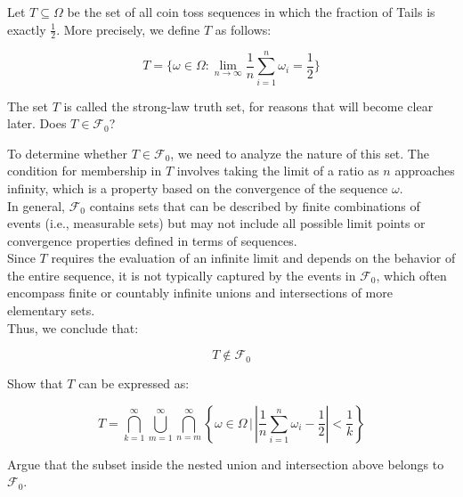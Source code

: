 \begin{exercise}
    Let \( T \subseteq \Omega \) be the set of all coin toss sequences in which the fraction of Tails is exactly \( \frac{1}{2} \). More precisely, we define \( T \) as follows:

\[
T = \{ \omega \in \Omega : \lim_{n \to \infty} \frac{1}{n} \sum_{i=1}^{n} \omega_i = \frac{1}{2} \}
\]

The set \( T \) is called the strong-law truth set, for reasons that will become clear later. Does \( T \in \mathcal{F}_0 \)?
\end{exercise}

\begin{solution}
    To determine whether \( T \in \mathcal{F}_0 \), we need to analyze the nature of this set. The condition for membership in \( T \) involves taking the limit of a ratio as \( n \) approaches infinity, which is a property based on the convergence of the sequence \( \omega \). \\

    In general, \( \mathcal{F}_0 \) contains sets that can be described by finite combinations of events (i.e., measurable sets) but may not include all possible limit points or convergence properties defined in terms of sequences. \\
    
    Since \( T \) requires the evaluation of an infinite limit and depends on the behavior of the entire sequence, it is not typically captured by the events in \( \mathcal{F}_0 \), which often encompass finite or countably infinite unions and intersections of more elementary sets.\\
    
    Thus, we conclude that:
    
    \[
    T \notin \mathcal{F}_0
    \]    
\end{solution}

\begin{exercise}
    Show that \( T \) can be expressed as:

\[
T = \bigcap_{k=1}^{\infty} \bigcup_{m=1}^{\infty} \bigcap_{n=m}^{\infty} \left\{ \omega \in \Omega \, \bigg| \, \left| \frac{1}{n} \sum_{i=1}^{n} \omega_i - \frac{1}{2} \right| < \frac{1}{k} \right\} 
\]

Argue that the subset inside the nested union and intersection above belongs to \( \mathcal{F}_0 \). 
\end{exercise}

